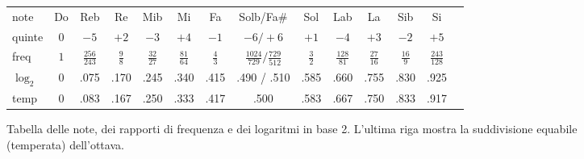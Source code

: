 \begin{figure}
    \begin{center}
        \setlength{\tabcolsep}{1mm}%
        \begin{tabular}{@{}l|ccccccccccccc@{}}
            note   &   Do   &   Reb           &   Re     &    Mib        &   Mi          &    Fa    &  Solb/Fa\#                       &   Sol    &  Lab           &   La          &   Sib         &   Si            \\
            quinte &   $0$  &  $-5$           &  $+2$    &    $-3$       &  $+4$         &   $-1$   &  $-6/+6$                         &  $+1$    &  $-4$          &  $+3$         &  $-2$         &  $+5$           \\
            freq   &   $1$  &$\frac{256}{243}$&$\frac 98$&$\frac{32}{27}$&$\frac{81}{64}$&$\frac 43$&$\frac{1024}{729}/\frac{729}{512}$&$\frac 32$&$\frac{128}{81}$&$\frac{27}{16}$&$\frac{16}9$   &$\frac{243}{128}$\\
        $\log_2$   &\small 0&\small .075 &\small  .170& \small  .245& \small  .340 & \small  .415& \small  .490 / .510         &\small  .585&\small  .660&\small  .755  &\small  .830  &\small  .925    \\
              temp &\small 0&\small .083 &\small  .167& \small  .250& \small  .333 & \small  .417& \small  .500                &\small  .583&\small  .667&\small  .750  &\small  .833  &\small  .917    \\
        \end{tabular}
    \end{center}
    \caption{Tabella delle note, dei rapporti di frequenza e dei logaritmi in base 2. 
    L’ultima riga mostra la suddivisione equabile (temperata) dell’ottava.}
\end{figure}
    

